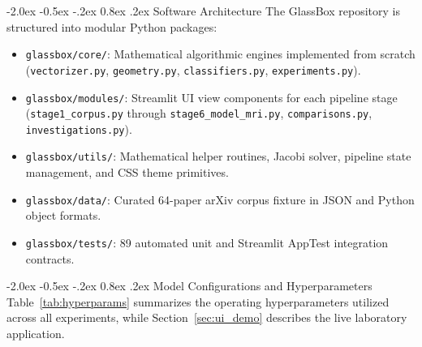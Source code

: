 \documentclass[12pt,a4paper]{report}
\makeatletter
\newenvironment{tightitemize}{%
  \begin{itemize}%
    \setlength{\itemsep}{1.5pt}%
    \setlength{\parskip}{0pt}%
    \setlength{\parsep}{0pt}%
}{%
  \end{itemize}%
}
\renewcommand\section{\@startsection {section}{1}{\z@}%
                                   {-2.0ex \@plus -0.5ex \@minus -.2ex}%
                                   {0.8ex \@plus.2ex}%
                                   {\normalfont\fontsize{14}{17}\bfseries\color{headerblue}}}
\makeatother
\begin{document}
\section{Software Architecture}
The GlassBox repository is structured into modular Python packages:
\begin{tightitemize}
    \item \texttt{glassbox/core/}: Mathematical algorithmic engines implemented from scratch (\texttt{vectorizer.py}, \texttt{geometry.py}, \texttt{classifiers.py}, \texttt{experiments.py}).
    \item \texttt{glassbox/modules/}: Streamlit UI view components for each pipeline stage (\texttt{stage1\_corpus.py} through \texttt{stage6\_model\_mri.py}, \texttt{comparisons.py}, \texttt{investigations.py}).
    \item \texttt{glassbox/utils/}: Mathematical helper routines, Jacobi solver, pipeline state management, and CSS theme primitives.
    \item \texttt{glassbox/data/}: Curated 64-paper arXiv corpus fixture in JSON and Python object formats.
    \item \texttt{glassbox/tests/}: 89 automated unit and Streamlit AppTest integration contracts.
\end{tightitemize}

\section{Model Configurations and Hyperparameters}
Table~\ref{tab:hyperparams} summarizes the operating hyperparameters utilized across all experiments, while Section~\ref{sec:ui_demo} describes the live laboratory application.
\end{document}

